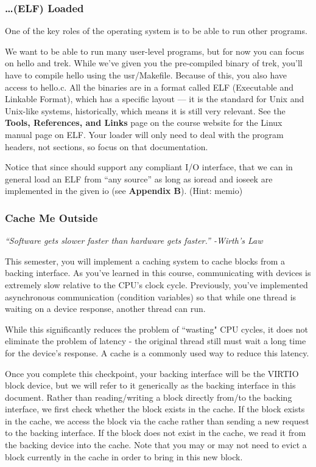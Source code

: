 \documentclass{article}
\begin{document}
	\subsubsection{\ldots (ELF) Loaded}
	One of the key roles of the operating system is to be able to run other programs.

	We want to be able to run many user-level programs, but for now you can focus on {\fix hello} and {\fix trek}.
	While we've given you the pre-compiled binary of {\fix trek}, you'll have to compile {\fix hello}
	using the {\fix usr/Makefile}. Because of this, you also have access to {\fix hello.c}.
	All the binaries are in a format called ELF 
	(Executable and Linkable Format), which has
	a specific layout --- it is the standard for Unix and Unix-like systems, historically,
	which means it is still very relevant. See the \textbf{Tools, References, and Links} page 
	on the course website for the Linux manual page on ELF. Your loader will only need to deal with
	the program headers, not sections, so focus on that documentation.

	Notice that since {} should support any compliant I/O interface,
	that we can in general load an ELF from ``any source'' as long as {\fix ioread} 
	and {\fix ioseek} are implemented in the given {\fix io} (see \textbf{Appendix B}). (Hint: {\fix memio})
    
	\subsubsection{Cache Me Outside}

    \emph{``Software gets slower faster than hardware gets faster.'' -Wirth's Law}

	This semester, you will implement a caching system to cache blocks from a backing interface. As you've learned in this course, 
	communicating with devices is extremely slow relative to the CPU's clock cycle. Previously, you've implemented 
	asynchronous communication (condition variables) so that while one thread is waiting on a device response, another thread can run.

	While this significantly reduces the problem of ``wasting" CPU cycles, it does not eliminate the problem of latency - the original thread
	still must wait a long time for the device's response. A cache is a commonly used way to reduce this latency.

	Once you complete this checkpoint, your backing interface will be the VIRTIO block device, but we will refer to it generically as the backing interface in this document.
	Rather than reading/writing a block directly from/to the backing interface, we first check whether the block exists in the cache. 
	If the block exists in the cache, we access the block via the cache rather than sending a new request to the backing interface. 
	If the block does not exist in the cache, we read it from the backing device into the cache. 
	Note that you may or may not need to evict a block currently in the cache in order to bring in this new block. 
	
\end{document}

